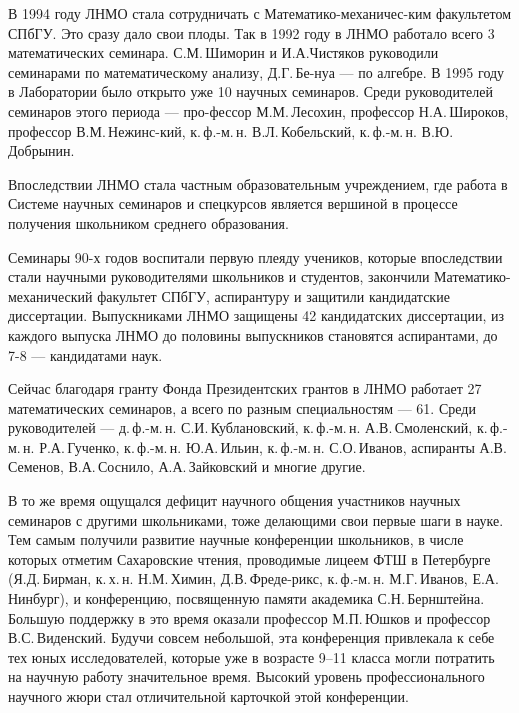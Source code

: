 \ms\abz В 1994 году ЛНМО стала сотрудничать с Математико-механичес-\linebreak ким факультетом СПбГУ. Это сразу дало свои плоды. Так в 1992 году в ЛНМО работало всего 3 математических семинара. С.М.\,Шиморин и И.А.\linebreak Чистяков руководили семинарами по математическому анализу, Д.Г.\,Бе-\linebreak нуа — по алгебре. В 1995 году в Лаборатории было открыто уже 10 научных семинаров. Среди руководителей семинаров этого периода — про-\linebreak фессор М.М.\,Лесохин, профессор Н.А.\,Широков, профессор В.М.\,Нежинс-\linebreak кий, к.\,ф.-м.\,н. В.Л.\,Кобельский, к.\,ф.-м.\,н. В.Ю.\,Добрынин.

\ms\abz Впоследствии ЛНМО стала частным образовательным учреждением, где работа в Системе научных семинаров и спецкурсов является вершиной в процессе получения школьником среднего образования. 

\ms\abz Семинары 90-х годов воспитали первую плеяду учеников, которые впоследствии стали научными руководителями школьников и студентов, закончили Математико-механический факультет СПбГУ, аспирантуру и защитили кандидатские диссертации. Выпускниками ЛНМО защищены 42 кандидатских диссертации, из каждого выпуска ЛНМО до половины выпускников становятся аспирантами, до 7-8 — кандидатами наук.

\ms\abz Сейчас благодаря гранту Фонда Президентских грантов в ЛНМО работает 27 математических семинаров, а всего по разным специальностям — 61. Среди руководителей — д.\,ф.-м.\,н. С.И.\,Кублановский, к.\,ф.-м.\,н. А.В.\,Смоленский, к.\,ф.-м.\,н. Р.А.\,Гученко, к.\,ф.-м.\,н. Ю.А.\,Ильин, к.\,ф.-м.\,н. С.О.\,Иванов, аспиранты А.В.\,Семенов, В.А.\,Соснило, А.А.\,Зайковский   и многие другие. 

\ms\abz В то же время ощущался дефицит научного общения участников научных семинаров с другими школьниками, тоже делающими свои первые шаги в науке. Тем самым получили развитие научные конференции школьников, в числе которых отметим Сахаровские чтения, проводимые лицеем ФТШ в Петербурге (Я.Д.\,Бирман, к.\,х.\,н. Н.М.\,Химин, Д.В.\,Фреде-\linebreak рикс, к.\,ф.-м.\,н. М.Г.\,Иванов, Е.А.\,Нинбург), и конференцию, посвященную памяти академика С.Н.\,Бернштейна. Большую поддержку в это время оказали профессор М.П.\,Юшков и профессор В.С.\,Виденский. Будучи совсем небольшой, эта конференция привлекала к себе тех юных исследователей, которые уже в возрасте 9–11 класса могли потратить на научную работу значительное время. Высокий уровень профессионального научного жюри стал отличительной карточкой этой конференции.

